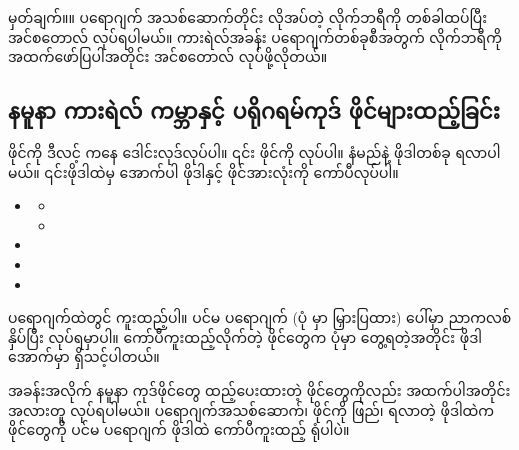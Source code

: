 \begin{mytcbox}
မှတ်ချက်။\qquad ။ ပရောဂျက် အသစ်ဆောက်တိုင်း လိုအပ်တဲ့ လိုက်ဘရီကို တစ်ခါထပ်ပြီး အင်စတောလ် လုပ်ရပါမယ်။ ကားရဲလ်အခန်း ပရောဂျက်တစ်ခုစီအတွက်  လိုက်ဘရီကို အထက်ဖော်ပြပါအတိုင်း အင်စတောလ် လုပ်ဖို့လိုတယ်။
\end{mytcbox}

\clearpage
\subsection*{နမူနာ ကားရဲလ် ကမ္ဘာနှင့် ပရိုဂရမ်ကုဒ် ဖိုင်များထည့်ခြင်း}
 ဖိုင်ကို  ဒီလင့်  ကနေ ဒေါင်းလုဒ်လုပ်ပါ။ ၎င်း  ဖိုင်ကို  လုပ်ပါ။  နံမည်နဲ့ ဖိုဒါတစ်ခု ရလာပါမယ်။ ၎င်းဖိုဒါထဲမှ အောက်ပါ  ဖိုဒါနှင့်  ဖိုင်အားလုံးကို ကော်ပီလုပ်ပါ။ 
%
\begin{itemize}
    \item {} 
    \begin{itemize}
        \item {}
        \item {}
    \end{itemize}
    \item {}
    \item {}
    \item {}
\end{itemize}
%

 ပရောဂျက်ထဲတွင် ကူးထည့်ပါ။ ပင်မ ပရောဂျက်  (ပုံ \fRefNo{\ref{fig:edit_meet_karel}} မှာ မြှားပြထား) ပေါ်မှာ ညာကလစ်နှိပ်ပြီး  လုပ်ရမှာပါ။ ကော်ပီကူးထည့်လိုက်တဲ့ ဖိုင်တွေက ပုံမှာ တွေ့ရတဲ့အတိုင်း   ဖိုဒါအောက်မှာ ရှိသင့်ပါတယ်။

\begin{mytcbox}
အခန်းအလိုက် နမူနာ ကုဒ်ဖိုင်တွေ ထည့်ပေးထားတဲ့  ဖိုင်တွေကိုလည်း အထက်ပါအတိုင်း အလားတူ လုပ်ရပါမယ်။ ပရောဂျက်အသစ်ဆောက်၊  ဖိုင်ကို ဖြည်၊ ရလာတဲ့ ဖိုဒါထဲက ဖိုင်တွေကို ပင်မ ပရောဂျက် ဖိုဒါထဲ ကော်ပီကူးထည့် ရုံပါပဲ။
\end{mytcbox}

